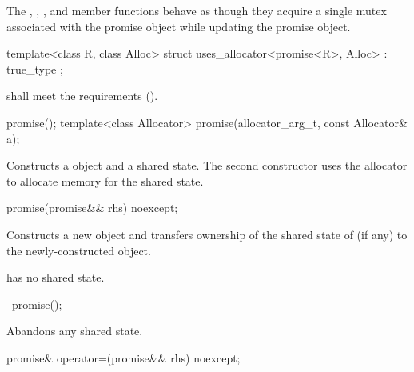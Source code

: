 \pnum
The , , ,
and  member functions behave as though
they acquire a single mutex associated with the promise object while updating the
promise object.

%
\begin{itemdecl}
template<class R, class Alloc>
  struct uses_allocator<promise<R>, Alloc>
    : true_type { };
\end{itemdecl}

\begin{itemdescr}
\pnum
\requires {} shall meet the 
requirements ().
\end{itemdescr}


%
\begin{itemdecl}
promise();
template<class Allocator>
  promise(allocator_arg_t, const Allocator& a);
\end{itemdecl}

\begin{itemdescr}
\pnum
\effects
Constructs a  object and a shared state. The second
constructor uses the allocator  to allocate memory for the shared
state.
\end{itemdescr}

%
\begin{itemdecl}
promise(promise&& rhs) noexcept;
\end{itemdecl}

\begin{itemdescr}
\pnum
\effects
Constructs a new  object and transfers ownership of the shared state
of  (if any) to the newly-constructed object.

\pnum
\ensures
{} has no shared state.
\end{itemdescr}

%
\begin{itemdecl}
~promise();
\end{itemdecl}

\begin{itemdescr}
\pnum
\effects
Abandons any shared state.
\end{itemdescr}

%
\begin{itemdecl}
promise& operator=(promise&& rhs) noexcept;
\end{itemdecl}

